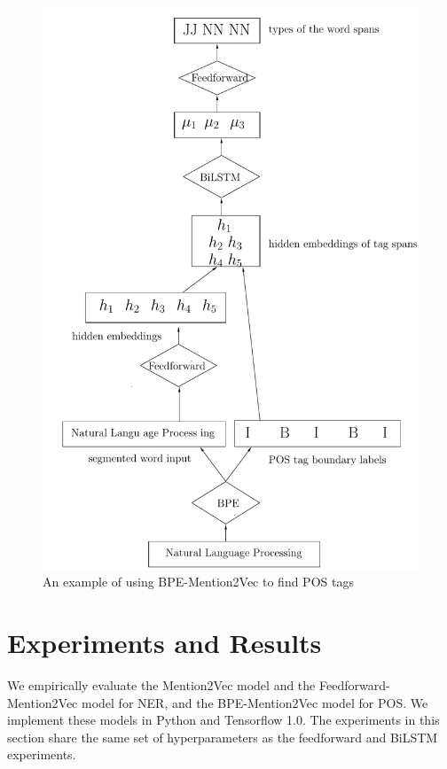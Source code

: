\begin{figure}
  \centering
  \includegraphics[scale=0.6]{bpemention2vec.pdf}
 \caption{An example of using BPE-Mention2Vec to find POS tags}
  \label{fig:bpemention2vec}
\end{figure}

\section{Experiments and Results}

We empirically evaluate the Mention2Vec model and the Feedforward-Mention2Vec model for NER, and the BPE-Mention2Vec model for POS. We implement these models in Python and Tensorflow 1.0. The experiments in this section share the same set of hyperparameters as the feedforward and BiLSTM experiments. 

